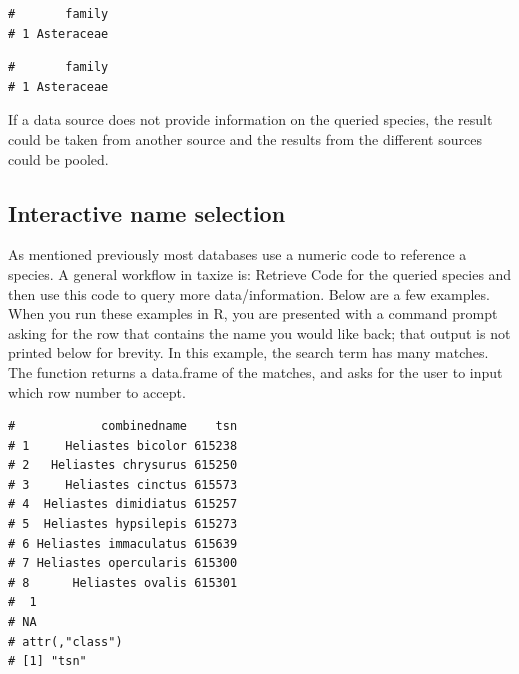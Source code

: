 \begin{sloppypar}
\begin{knitrout}
\small
{}
\color{fgcolor}
\begin{kframe}
\begin{alltt}
\hlstd{(} \hlstd{=} \hlstd{,}  \hlstd{=} \hlstd{,}
          \hlstd{=} \hlstd{)}
\end{alltt}
\begin{verbatim}
#       family
# 1 Asteraceae
\end{verbatim}
\begin{alltt}
\hlstd{(} \hlstd{=} \hlstd{,}  \hlstd{=} \hlstd{,}
          \hlstd{=} \hlstd{)}
\end{alltt}
\begin{verbatim}
#       family
# 1 Asteraceae
\end{verbatim}
\end{kframe}
\end{knitrout}

If a data source does not provide information on the queried species, the result could be taken from another source and the results from the different sources could be pooled.


\subsection{Interactive name selection}
As mentioned previously most databases use a numeric code to reference a species. 
A general workflow in taxize is: Retrieve Code for the queried species and then use this code to query more data/information. 
Below are a few examples. 
When you run these examples in R, you are presented with a command prompt asking for the row that contains the name you would like back; that output is not printed below for brevity. 
In this example, the search term has many matches. 
The function returns a data.frame of the matches, and asks for the user to input which row number to accept. 

\begin{knitrout}
\small
{}
\color{fgcolor}
\begin{kframe}
\begin{alltt}
\hlstd{(} \hlstd{=} \hlstd{,}  \hlstd{=} \hlstd{)}
\end{alltt}
\begin{verbatim}
#            combinedname    tsn
# 1     Heliastes bicolor 615238
# 2   Heliastes chrysurus 615250
# 3     Heliastes cinctus 615573
# 4  Heliastes dimidiatus 615257
# 5  Heliastes hypsilepis 615273
# 6 Heliastes immaculatus 615639
# 7 Heliastes opercularis 615300
# 8      Heliastes ovalis 615301
#  1 
# NA 
# attr(,"class")
# [1] "tsn"
\end{verbatim}
\end{kframe}
\end{knitrout}


\end{sloppypar}
